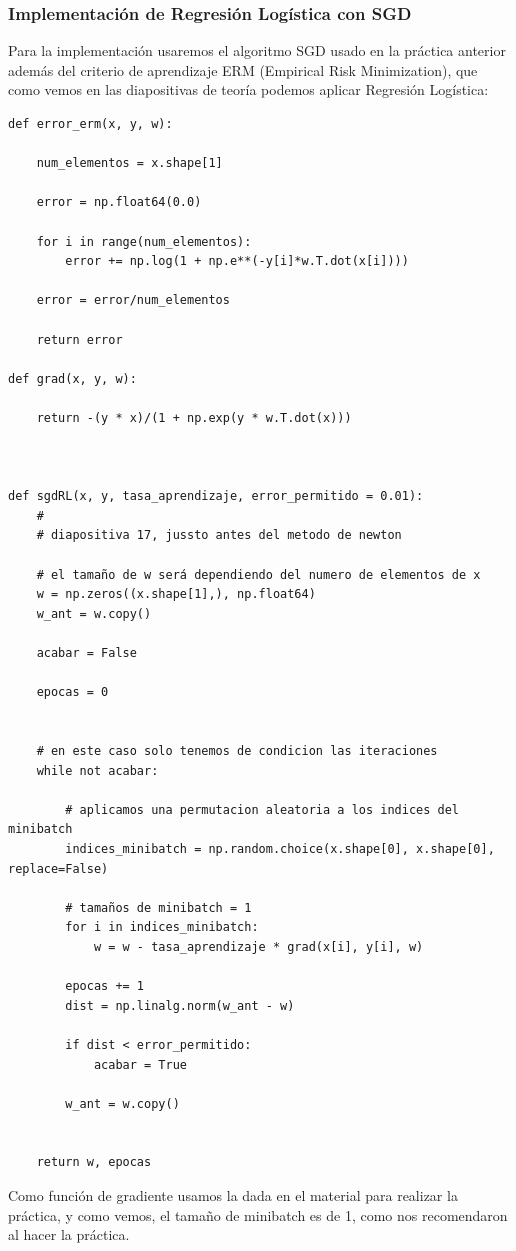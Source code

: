 \documentclass[12pt, spanish]{article}
\begin{document}
\subsubsection{Implementación de Regresión Logística con SGD}

Para la implementación usaremos el algoritmo SGD usado en la práctica anterior además del criterio de aprendizaje ERM (Empirical Risk Minimization), que como vemos en las diapositivas de teoría podemos aplicar Regresión Logística:

\begin{lstlisting}
def error_erm(x, y, w):

	num_elementos = x.shape[1]

	error = np.float64(0.0)

	for i in range(num_elementos):
		error += np.log(1 + np.e**(-y[i]*w.T.dot(x[i])))

	error = error/num_elementos

	return error

def grad(x, y, w):

	return -(y * x)/(1 + np.exp(y * w.T.dot(x)))



def sgdRL(x, y, tasa_aprendizaje, error_permitido = 0.01):
    #
	# diapositiva 17, jussto antes del metodo de newton

	# el tamaño de w será dependiendo del numero de elementos de x
	w = np.zeros((x.shape[1],), np.float64)
	w_ant = w.copy()

	acabar = False

	epocas = 0


	# en este caso solo tenemos de condicion las iteraciones
	while not acabar:

		# aplicamos una permutacion aleatoria a los indices del minibatch
		indices_minibatch = np.random.choice(x.shape[0], x.shape[0], replace=False)

		# tamaños de minibatch = 1
		for i in indices_minibatch:
			w = w - tasa_aprendizaje * grad(x[i], y[i], w)

		epocas += 1
		dist = np.linalg.norm(w_ant - w)

		if dist < error_permitido:
			acabar = True

		w_ant = w.copy()


	return w, epocas
\end{lstlisting}

Como función de gradiente usamos la dada en el material para realizar la práctica, y como vemos, el tamaño de minibatch es de 1, como nos recomendaron al hacer la práctica.
\end{document}
